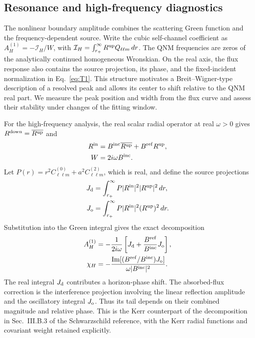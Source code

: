 \documentclass[aps,prd,twocolumn,10pt,nofootinbib,superscriptaddress,floatfix]{revtex4-2}
\begin{document}
\subsection{Resonance and high-frequency diagnostics}
\label{sec:frequency-diagnostics}

The nonlinear boundary amplitude combines the scattering Green function
and the frequency-dependent source.  Write the cubic self-channel
coefficient as $A_H^{(1)}=-\mathcal I_H/W$, with
$\mathcal I_H=\int_{r_+}^\infty R^{\rm up}Q_{\ell\ell m}\,dr$.
The QNM frequencies are zeros of the analytically continued homogeneous
Wronskian.  On the real axis, the flux response also contains the source
projection, its phase, and the fixed-incident normalization in
Eq.~\eqref{eq:T1}.  This structure motivates a Breit--Wigner-type
description of a resolved peak and allows its center to shift relative to
the QNM real part.  We measure the peak position and width from the flux
curve and assess their stability under changes of the fitting window.

For the high-frequency analysis, the real scalar radial operator at real
$\omega>0$ gives $R^{\rm down}=\overline{R^{\rm up}}$ and
\begin{align}
R^{\rm in}&=B^{\rm inc}\overline{R^{\rm up}}+B^{\rm ref}R^{\rm up},
\nonumber\\
W&=2i\omega B^{\rm inc}.
\end{align}
Let $P(r)=r^2C^{(0)}_{\ell\ell m}+a^2C^{(2)}_{\ell\ell m}$, which is real,
and define the source projections
\begin{align}
J_{\rm d}&=\int_{r_+}^\infty P|R^{\rm in}|^2|R^{\rm up}|^2\,dr,
\nonumber\\
J_{\rm o}&=\int_{r_+}^\infty P|R^{\rm in}|^2(R^{\rm up})^2\,dr.
\end{align}
Substitution into the Green integral gives the exact decomposition
\begin{align}
A_H^{(1)}&=-\frac{1}{2i\omega}
\left[J_{\rm d}+\frac{B^{\rm ref}}{B^{\rm inc}}J_{\rm o}\right],
\nonumber\\
\chi_H&=-\frac{\operatorname{Im}[(B^{\rm ref}/B^{\rm inc})J_{\rm o}]}
{\omega|B^{\rm inc}|^2}.
\label{eq:kerr-tail-decomposition}
\end{align}
The real integral $J_{\rm d}$ contributes a horizon-phase shift.  The
absorbed-flux correction is the interference projection involving the
linear reflection amplitude and the oscillatory integral $J_{\rm o}$.
Thus its tail depends on their combined magnitude and relative phase.
This is the Kerr counterpart of the decomposition in Sec.~III.B.3 of the
Schwarzschild reference\cite{HeTianZhangManuscript2026}, with the Kerr
radial functions and covariant weight retained explicitly.
\end{document}
